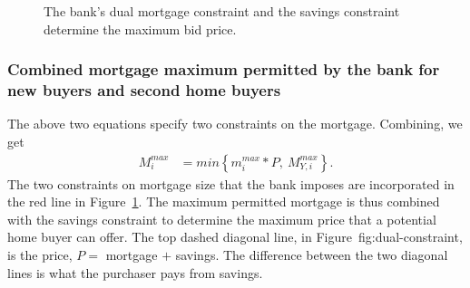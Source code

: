 {  \begin{figure}
    \centering
    
    \caption[The bank's dual mortgage constraint and the savings constraint]{The bank's dual mortgage constraint and the savings constraint determine the maximum bid price.}
    \label{fig:dual-constraint}
    \end{figure}

\subsubsection{Combined mortgage maximum permitted by the bank for new buyers and second home buyers}

The above two equations specify two constraints on the mortgage.  Combining, we get 
\begin{align} 
M_i^{max} &= min \left\{ m_i^{max}*P, \ M^{max}_{Y,i} \right\}. 
\label{eqn-max-mortgage-combined}
\end{align}
The two constraints on mortgage size that the bank imposes are incorporated in the red line in Figure~\ref{fig:dual-constraint}. The maximum permitted mortgage is thus combined with the savings constraint to determine the maximum price that a potential home buyer can offer. The top dashed diagonal line, in Figure~{fig:dual-constraint}, is the price, $P =$ mortgage $+$ savings. The difference between the two diagonal lines is what the purchaser pays from savings. %

}
